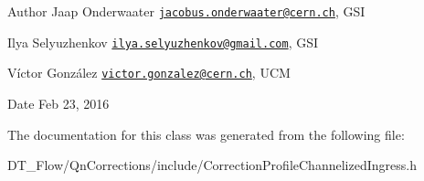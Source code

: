 \begin{DoxyAuthor}{Author}
Jaap Onderwaater \href{mailto:jacobus.onderwaater@cern.ch}{\tt jacobus.\+onderwaater@cern.\+ch}, G\+SI 

Ilya Selyuzhenkov \href{mailto:ilya.selyuzhenkov@gmail.com}{\tt ilya.\+selyuzhenkov@gmail.\+com}, G\+SI 

Víctor González \href{mailto:victor.gonzalez@cern.ch}{\tt victor.\+gonzalez@cern.\+ch}, U\+CM 
\end{DoxyAuthor}
\begin{DoxyDate}{Date}
Feb 23, 2016 
\end{DoxyDate}


The documentation for this class was generated from the following file\+:\begin{DoxyCompactItemize}
\item 
D\+T\+\_\+\+Flow/\+Qn\+Corrections/include/Correction\+Profile\+Channelized\+Ingress.\+h\end{DoxyCompactItemize}
